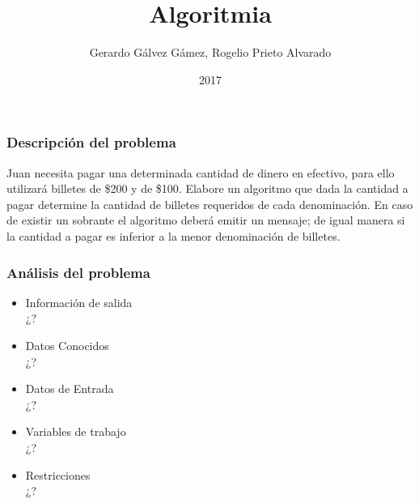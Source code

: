 \documentclass{beamer}
\title{Algoritmia}
\author{Gerardo Gálvez Gámez, Rogelio Prieto Alvarado}
\institute{Facultad de Informática Culiacán\\Universidad Autónoma de Sinaloa}
\date{2017}
\begin{document}
\maketitle


\begin{frame}
\frametitle{Descripción del problema}
Juan necesita pagar una determinada cantidad de dinero en efectivo, para ello utilizará billetes de \$200 y de \$100. Elabore un algoritmo que dada la cantidad a pagar determine la cantidad de billetes requeridos de cada denominación. En caso de existir un sobrante el algoritmo deberá emitir un mensaje; de igual manera si la cantidad a pagar es inferior a la menor denominación de billetes.
\end{frame}

\begin{frame}
\frametitle{Análisis del problema}
\begin{itemize}
\item Información de salida
\\¿?
\item Datos Conocidos
\\¿?
\item Datos de Entrada
\\¿?
\item Variables de trabajo
\\¿?
\item Restricciones
\\¿?
\end{itemize}
\end{frame}
\end{document}
